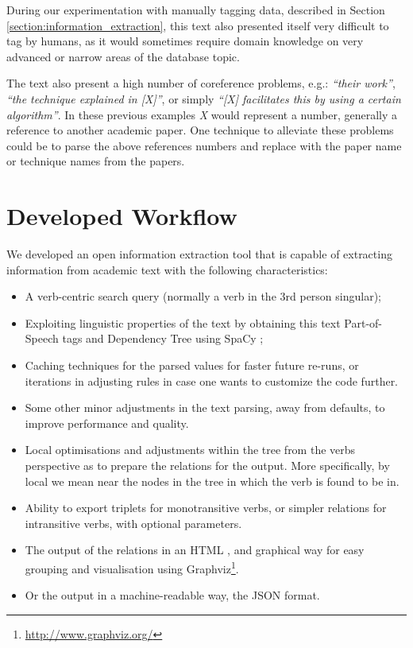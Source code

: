 \documentclass[11pt,a4paper,openright]{memoir}
\begin{document}
During our experimentation with manually tagging data, described in Section \ref{section:information_extraction}, this text also presented itself very difficult to tag by humans, as it would sometimes require domain knowledge on very advanced or narrow areas of the database topic.

The text also present a high number of coreference problems, e.g.: \emph{\enquote{their work}}, \emph{\enquote{the technique explained in [X]}}, or simply \emph{\enquote{[X] facilitates this by using a certain algorithm}}. In these previous examples \emph{X} would represent a number, generally a reference to another academic paper. One technique to alleviate these problems could be to parse the above references numbers and replace with the paper name or technique names from the papers.



%
%
%
%


\chapter{Developed Workflow}

We developed an open information extraction tool that is capable of extracting information from academic text with the following characteristics:
\begin{itemize}
	\item A verb-centric search query (normally a verb in the 3rd person singular);
	\item Exploiting linguistic properties of the text by obtaining this text Part-of-Speech tags and Dependency Tree using SpaCy \cite{honnibal-johnson:2015:EMNLP, spacy};
	\item Caching techniques for the parsed values for faster future re-runs, or iterations in adjusting rules in case one wants to customize the code further.
	\item Some other minor adjustments in the text parsing, away from defaults, to improve performance and quality.
	\item Local optimisations and adjustments within the tree from the verbs perspective as to prepare the relations for the output. More specifically, by local we mean near the nodes in the tree in which the verb is found to be in.
	\item Ability to export triplets for monotransitive verbs, or simpler relations for intransitive verbs, with optional parameters.
	\item The output of the relations in an HTML \cite{html}, and graphical way for easy grouping and visualisation using Graphviz\footnote{\url{http://www.graphviz.org/}}.
	\item Or the output in a machine-readable way, the JSON \cite{json} format.
\end{itemize}
\end{document}
